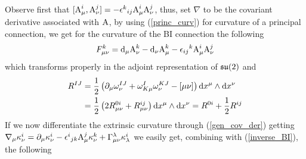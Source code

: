 Observe first that $[\text{\normalfont A}_\mu^i,\text{\normalfont A}_\nu^j]=-{\epsilon^k}_{ij}\text{\normalfont A}^i_\mu\text{\normalfont A}^j_\nu$, thus, set $\nabla$ to be the covariant derivative associated with $\text{\normalfont A}$, by using (\ref{princ_curv}) for curvature of a principal connection, we get for the curvature of the BI connection the following
$$F_{\mu\nu}^k=\text{\normalfont d}_\mu\text{\normalfont A}^k_\nu-\text{\normalfont d}_\nu\text{\normalfont A}^k_\mu-{\epsilon_{ij}}^k\text{\normalfont A}^i_\mu\text{\normalfont A}^j_\nu$$
which transforms properly in the adjoint representation of $\mathfrak{su}(2)$ and
\begin{align*}
    R^{IJ}&=\frac{1}{2}\left(\partial_\mu\omega_\nu^{IJ}+\omega^I_{K\mu}\omega^{KJ}_\nu-[\mu\nu]\right)\text{\normalfont d} x^\mu\wedge\text{\normalfont d} x^\nu\\
    &=\frac{1}{2}\left(2R^{0i}_{\mu\nu}+R^{ij}_{\mu\nu}\right)\text{\normalfont d} x^\mu\wedge\text{\normalfont d} x^\nu=R^{0i}+\frac{1}{2}R^{ij}
\end{align*}
If we now differentiate the extrinsic curvature through (\ref{gen_cov_der}) getting $\nabla_\mu\kappa^i_\nu=\partial_\mu\kappa^i_\nu-{\epsilon^i}_{jk}\text{\normalfont A}^j_\mu\kappa^k_\nu+\Gamma^\lambda_{\mu\nu}\kappa^i_\lambda$ we easily get, combining with (\ref{inverse_BI}), the following


